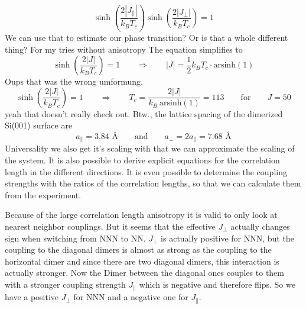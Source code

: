 	\begin{equation}
		\sinh(\frac{2 |J_{\parallel}|}{k_B T_c}) \sinh(\frac{2 |J_{\perp}|}{k_B T_c}) =	1
	\end{equation}
	We can use that to estimate our phase transition? Or is that a whole different thing? For my tries without anisotropy The equation simplifies to
	\begin{equation}
		\sinh\left(\frac{2 |J|}{k_B T_c}\right) =	1 \qquad \Rightarrow \qquad |J| =	\frac{1}{2}k_B T_c \cdot \text{arsinh}\left(1\right)
	\end{equation}
	Oups that was the wrong umformung.
	\begin{equation}
		\sinh\left(\frac{2 |J|}{k_B T_c}\right) =	1 \qquad \Rightarrow \qquad T_c = \frac{2 |J|}{k_B ~ \text{arsinh}\left(1\right)} = 113 \qquad \text{for} \qquad J = 50
	\end{equation}
	yeah that doesn't really check out.
	Btw., the lattice spacing of the dimerized Si(001) surface are
	\begin{equation}
		a_{\parallel} =	3.84 \text{~\AA} \qquad \text{and} \qquad a_{\perp} =	2a_{\parallel} = 7.68 \text{~\AA}
	\end{equation}
	Universality we also get it's scaling with that we can approximate the scaling of the system. It is also possible to derive explicit equations for the correlation length in the different directions. It is even possible to determine the coupling strengths with the ratios of the correlation lengths, so that we can calculate them from the experiment.
	
	Because of the large correlation length anisotropy it is valid to only look at nearest neighbor couplings. But it seems that the effective $J_\perp$ actually changes sign when switching from NNN to NN. $J_\perp$ is actually positive for NNN, but the coupling to the diagonal dimers is almost as strong as the coupling to the horizontal dimer and since there are two diagonal dimers, this interaction is actually stronger. Now the Dimer between the diagonal ones couples to them with a stronger coupling strength $J_\parallel$ which is negative and therefore flips. So we have a positive $J_\perp$ for NNN and a negative one for $J_\parallel$.
	
